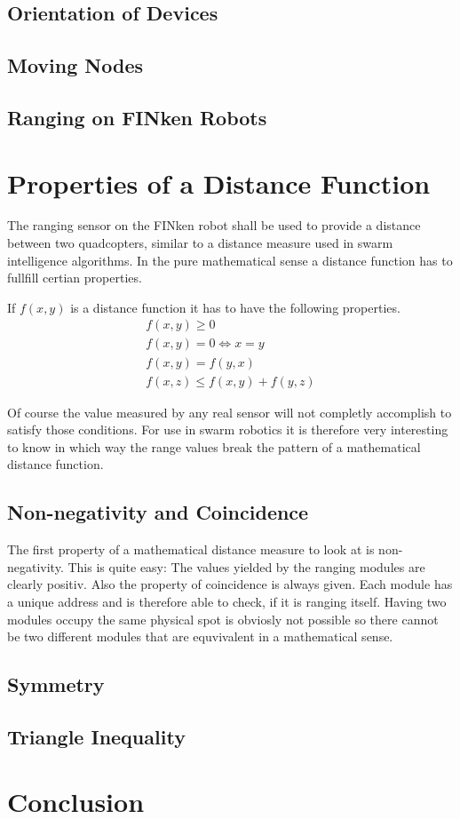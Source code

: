 \subsection{Orientation of Devices}


\subsection{Moving Nodes}

\subsection{Ranging on FINken Robots}

\section{Properties of a Distance Function}
The ranging sensor on the FINken robot shall be used to provide a distance between two quadcopters, similar to a distance measure used in swarm intelligence algorithms.
In the pure mathematical sense a distance function has to fullfill certian properties.

If $f(x, y)$ is a distance function it has to have the following properties.
\begin{eqnarray}
f(x, y) \ge 0 \\
f(x, y) = 0 \iff x = y \\ 
f(x, y) = f(y, x) \\ 
f(x, z) \le f(x, y) + f(y, z)
\end{eqnarray}

Of course the value measured by any real sensor will not completly accomplish to satisfy those conditions.
For use in swarm robotics it is therefore very interesting to know in which way the range values break the pattern of a mathematical distance function.

\subsection{Non-negativity and Coincidence}

The first property of a mathematical distance measure to look at is non-negativity. This is quite easy: The values yielded by the ranging modules are clearly positiv.
Also the property of coincidence is always given.
Each module has a unique address and is therefore able to check, if it is ranging itself.
Having two modules occupy the same physical spot is obviosly not possible so there cannot be two different modules that are equvivalent in a mathematical sense.

\subsection{Symmetry}

\subsection{Triangle Inequality}



\section{Conclusion}
